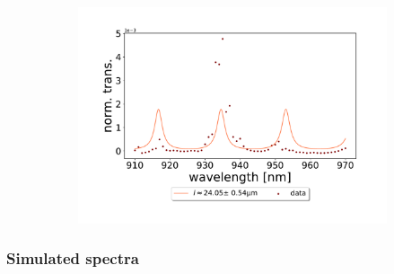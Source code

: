 \begin{figure}[h!]
\begin{subfigure}[b]{0.49\textwidth}
        \includegraphics[width=\textwidth]{figures/results/single fano fits/5um_off_res_fabry_perot.pdf}
        \caption{}
        \label{fig:5um_off_res_fabry_perot}
    \end{subfigure}
\end{figure}

\clearpage
\subsubsection*{Simulated spectra}

